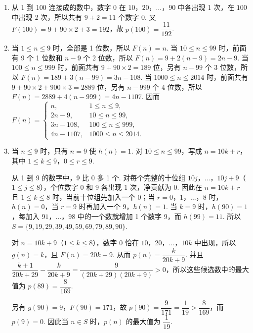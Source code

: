 \begin{solution}
\begin{enumerate}
\item 从 1 到 100 连接成的数中，数字 0 在 \(10\)，\(20\)，\(\ldots\)，\(90\) 中各出现 1 次，在 \(100\) 中出现 2 次，所以共有 \(9+2=11\) 个数字 0. 又
\(F(100)=9+90\times2+3=192\)，故 \(p(100)=\dfrac{11}{192}\).
\item 当 \(1\leqslant n\leqslant9\) 时，全部是 1 位数，所以 \(F(n)=n\). 当 \(10\leqslant n\leqslant99\) 时，前面有 9 个 1 位数和 \(n-9\) 个 2 位数，所以 \(F(n)=9+2(n-9)=2n-9\). 当 \(100\leqslant n\leqslant999\) 时，前面共有 \(9+90\times2=189\) 位，另有 \(n-99\) 个 3 位数，所以 \(F(n)=189+3(n-99)=3n-108\). 当 \(1000\leqslant n\leqslant2014\) 时，前面共有 \(9+90\times2+900\times3=2889\) 位，另有 \(n-999\) 个 4 位数，所以 \(F(n)=2889+4(n-999)=4n-1107\). 因而
\(F(n)=\begin{cases}
n,&1\leqslant n\leqslant9,\\
2n-9,&10\leqslant n\leqslant99,\\
3n-108,&100\leqslant n\leqslant999,\\
4n-1107,&1000\leqslant n\leqslant2014.
\end{cases}\)
\item 当 \(n\leqslant9\) 时，只有 \(n=9\) 使 \(h(n)=1\). 对 \(10\leqslant n\leqslant99\)，写成 \(n=10k+r\)，其中 \(1\leqslant k\leqslant9\)，\(0\leqslant r\leqslant9\).

从 1 到 9 的数字中，9 比 0 多 1 个. 对每个完整的十位组 \(10j\)，\(\ldots\)，\(10j+9\)（\(1\leqslant j\leqslant8\)），个位数字 0 和 9 各出现 1 次，净贡献为 0. 因此在 \(n=10k+r\) 且 \(1\leqslant k\leqslant8\) 时，当前十位组先加入一个 0；当 \(r=0\)，\(1\)，\(\ldots\)，\(8\) 时，\(h(n)=0\)，当 \(r=9\) 时再加入一个 9，\(h(n)=1\). 当 \(k=9\) 时，\(h(90)=1\)，每加入 \(91\)，\(\ldots\)，\(98\) 中的一个数就增加 1 个数字 9，而 \(h(99)=11\). 所以
\(S=\{9,19,29,39,49,59,69,79,89,90\}\).

对 \(n=10k+9\)（\(1\leqslant k\leqslant8\)），数字 0 恰在 \(10\)，\(20\)，\(\ldots\)，\(10k\) 中出现，所以 \(g(n)=k\)，且 \(F(n)=20k+9\). 从而 \(p(n)=\dfrac{k}{20k+9}\). 并且
\(\dfrac{k+1}{20k+29}-\dfrac{k}{20k+9}=\dfrac{9}{(20k+29)(20k+9)}>0\)，所以这些候选数中的最大值为 \(p(89)=\dfrac8{169}\).

另有 \(g(90)=9\)，\(F(90)=171\)，故 \(p(90)=\dfrac9{171}=\dfrac1{19}>\dfrac8{169}\)，而 \(p(9)=0\). 因此当 \(n\in S\) 时，\(p(n)\) 的最大值为 \(\dfrac1{19}\).
\end{enumerate}
\end{solution}
